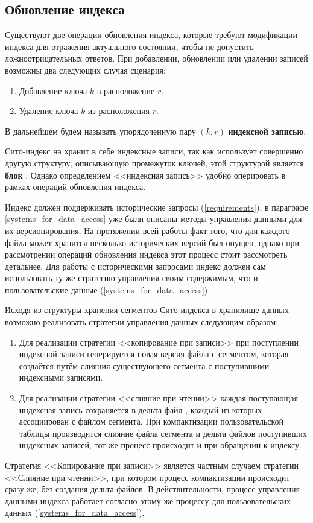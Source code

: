 \subsection{Обновление индекса}

Существуют две операции обновления индекса, которые требуют модификации индекса для отражения актуального состоянии, чтобы не допустить ложноотрицательных ответов. При добавлении, обновлении или удалении записей возможны два следующих случая сценария: 
\begin{enumerate}
    \item Добавление ключа $k$ в расположение $r$.
    \item Удаление ключа $k$ из расположения $r$.
\end{enumerate}

В дальнейшем будем называть упорядоченную пару $(k, r)$ \textbf{индексной записью}.

Сито-индекс на хранит в себе индексные записи, так как использует совершенно другую структуру, описывающую промежуток ключей, этой структурой является \textbf{блок} . Однако определением {<<индексная запись>>} удобно оперировать в рамках операций обновления индекса.

Индекс должен поддерживать исторические запросы (\ref{requirements}), в параграфе \ref{systems_for_data_access} уже были описаны методы управления данными для их версионирования. На протяжении всей работы факт того, что для каждого файла может хранится несколько исторических версий был опущен, однако при рассмотрении операций обновления индекса этот процесс стоит рассмотреть детальнее. Для работы с историческими запросами индекс должен сам использовать ту же стратегию управления своим содержимым, что и пользовательские данные (\ref{systems_for_data_access}).

Исходя из структуры хранения сегментов Сито-индекса в хранилище данных возможно реализовать стратегии управления данных следующим образом:
\begin{enumerate}
    \item Для реализации стратегии {<<копирование при записи>>} при поступлении индексной записи генерируется новая версия файла с сегментом, которая создаётся путём слияния существующего сегмента с поступившими индексными записями.
    \item Для реализации стратегии {<<слияние при чтении>>} каждая поступающая индексная запись сохраняется в дельта-файл , каждый из которых ассоциирован с файлом сегмента. При компактизации пользовательской таблицы производится слияние файла сегмента и дельта файлов поступивших индексных записей, тот же процесс происходит и при обращении к индексу.
\end{enumerate}
Стратегия {<<Копирование при записи>>} является частным случаем стратегии {<<Слияние при чтении>>}, при котором процесс компактизации происходит сразу же, без создания дельта-файлов. В действительности, процесс управления данными индекса работает согласно этому же процессу для пользовательских данных (\ref{systems_for_data_access}).

